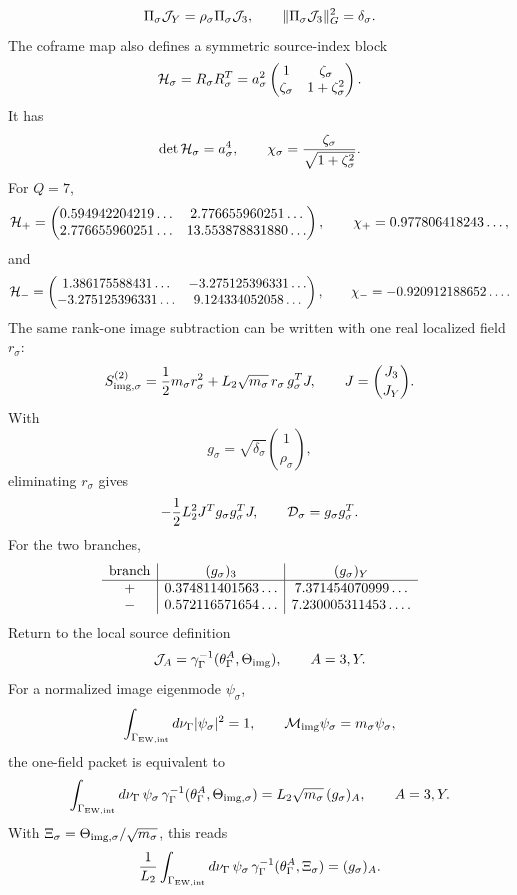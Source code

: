 \documentclass[11pt]{article}
\theoremstyle{definition}
\theoremstyle{remark}
\begin{document}
\[
  \Pi_\sigma{\cal J}_Y
  =
  \rho_\sigma\Pi_\sigma{\cal J}_3,
  \qquad
  \|\Pi_\sigma{\cal J}_3\|_G^2=\delta_\sigma .
\]
The coframe map also defines a symmetric source-index block
\[
  {\cal H}_\sigma=R_\sigma R_\sigma^T
  =
  a_\sigma^2
  \begin{pmatrix}
  1&\zeta_\sigma\\
  \zeta_\sigma&1+\zeta_\sigma^2
  \end{pmatrix}.
\]
It has
\[
  \det{\cal H}_\sigma=a_\sigma^4,
  \qquad
  \chi_\sigma
  =
  \frac{\zeta_\sigma}{\sqrt{1+\zeta_\sigma^2}} .
\]
For \(Q=7\),
\[
{\cal H}_+
=
\begin{pmatrix}
0.594942204219\ldots&2.776655960251\ldots\\
2.776655960251\ldots&13.553878831880\ldots
\end{pmatrix},
\qquad
\chi_+=0.977806418243\ldots ,
\]
and
\[
{\cal H}_-
=
\begin{pmatrix}
1.386175588431\ldots&-3.275125396331\ldots\\
-3.275125396331\ldots&9.124334052058\ldots
\end{pmatrix},
\qquad
\chi_-=-0.920912188652\ldots .
\]
The same rank-one image subtraction can be written with one real localized
field \(r_\sigma\):
\[
  S_{{\rm img},\sigma}^{(2)}
  =
  \frac12m_\sigma r_\sigma^2
  +L_2\sqrt{m_\sigma}\,
  r_\sigma\,g_\sigma^TJ,
  \qquad
  J=\binom{J_3}{J_Y}.
\]
With
\[
  g_\sigma=\sqrt{\delta_\sigma}\binom{1}{\rho_\sigma},
\]
eliminating \(r_\sigma\) gives
\[
  -\frac12L_2^2J^Tg_\sigma g_\sigma^TJ,
  \qquad
  {\cal D}_\sigma=g_\sigma g_\sigma^T .
\]
For the two branches,
\[
\begin{array}{c|c|c}
{\rm branch}&(g_\sigma)_3&(g_\sigma)_Y\\ \hline
+&0.374811401563\ldots&7.371454070999\ldots\\
-&0.572116571654\ldots&7.230005311453\ldots .
\end{array}
\]
Return to the local source definition
\[
  {\cal J}_A
  =
  \gamma_\Gamma^{-1}(\theta_\Gamma^A,\Theta_{\rm img}),
  \qquad A=3,Y .
\]
For a normalized image eigenmode \(\psi_\sigma\),
\[
  \int_{\Gamma_{\rm EW,int}}d\nu_\Gamma|\psi_\sigma|^2=1,
  \qquad
  {\cal M}_{\rm img}\psi_\sigma=m_\sigma\psi_\sigma ,
\]
the one-field packet is equivalent to
\[
  \int_{\Gamma_{\rm EW,int}}d\nu_\Gamma\,
  \psi_\sigma\,
  \gamma_\Gamma^{-1}(\theta_\Gamma^A,\Theta_{{\rm img},\sigma})
  =
  L_2\sqrt{m_\sigma}\,(g_\sigma)_A,
  \qquad A=3,Y .
\]
With \(\Xi_\sigma=\Theta_{{\rm img},\sigma}/\sqrt{m_\sigma}\), this reads
\[
  \frac{1}{L_2}
  \int_{\Gamma_{\rm EW,int}}d\nu_\Gamma\,
  \psi_\sigma\,
  \gamma_\Gamma^{-1}(\theta_\Gamma^A,\Xi_\sigma)
  =
  (g_\sigma)_A .
\]
\end{document}
